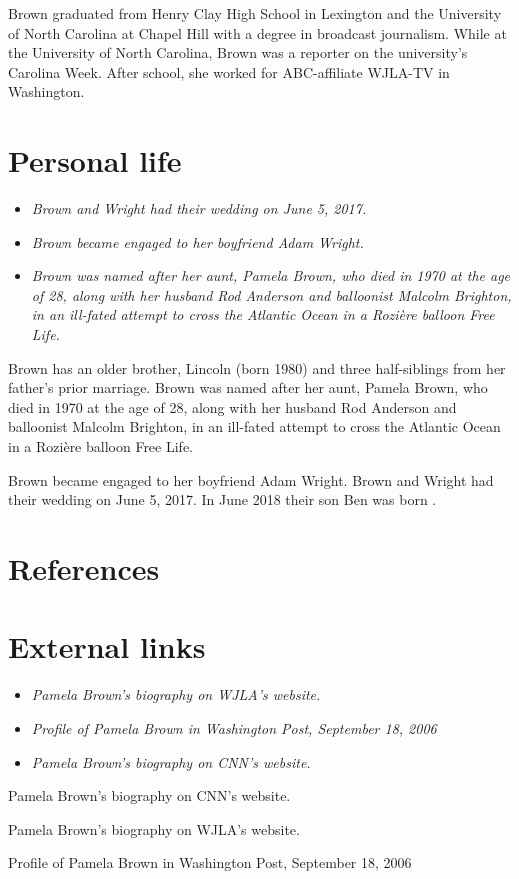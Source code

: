 Brown graduated from Henry Clay High School in Lexington and the
University of North Carolina at Chapel Hill with a degree in broadcast
journalism. While at the University of North Carolina, Brown was a
reporter on the university's Carolina Week. After school, she worked for
ABC-affiliate WJLA-TV in Washington.

\section{Personal life}\label{personal-life}

\begin{itemize}
\item
  \emph{Brown and Wright had their wedding on June 5, 2017.}
\item
  \emph{Brown became engaged to her boyfriend Adam Wright.}
\item
  \emph{Brown was named after her aunt, Pamela Brown, who died in 1970
  at the age of 28, along with her husband Rod Anderson and balloonist
  Malcolm Brighton, in an ill-fated attempt to cross the Atlantic Ocean
  in a Rozière balloon Free Life.}
\end{itemize}

Brown has an older brother, Lincoln (born 1980) and three half-siblings
from her father's prior marriage. Brown was named after her aunt, Pamela
Brown, who died in 1970 at the age of 28, along with her husband Rod
Anderson and balloonist Malcolm Brighton, in an ill-fated attempt to
cross the Atlantic Ocean in a Rozière balloon Free Life.

Brown became engaged to her boyfriend Adam Wright. Brown and Wright had
their wedding on June 5, 2017. In June 2018 their son Ben was born .

\section{References}\label{references}

\section{External links}\label{external-links}

\begin{itemize}
\item
  \emph{Pamela Brown's biography on WJLA's website.}
\item
  \emph{Profile of Pamela Brown in Washington Post, September 18, 2006}
\item
  \emph{Pamela Brown's biography on CNN's website.}
\end{itemize}

Pamela Brown's biography on CNN's website.

Pamela Brown's biography on WJLA's website.

Profile of Pamela Brown in Washington Post, September 18, 2006
